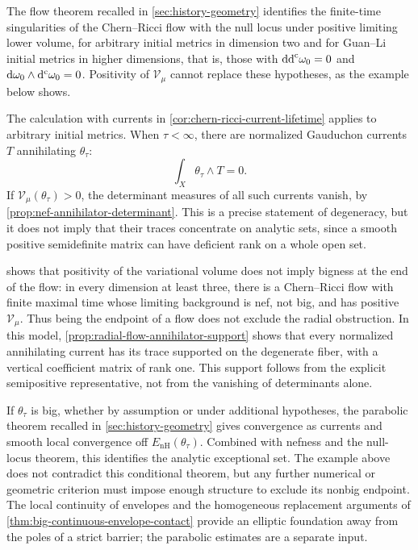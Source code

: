 The flow theorem recalled in \cref{sec:history-geometry} identifies the finite-time singularities of the Chern--Ricci flow with the null locus under positive limiting lower volume, for arbitrary initial metrics in dimension two and for Guan--Li initial metrics in higher dimensions, that is, those with $\mathrm{dd}^{\mathrm{c}}\omega_0=0$ and $\mathrm{d}\omega_0\wedge \mathrm d^{\mathrm c}\omega_0=0$. Positivity of $\mathcal V_\mu$ cannot replace these hypotheses, as the example below shows.

The calculation with currents in \cref{cor:chern-ricci-current-lifetime} applies to arbitrary initial metrics. When $\tau<\infty$, there are normalized Gauduchon currents $T$ annihilating $\theta_\tau$:
\[
 \int_X\theta_\tau\wedge T=0.
\]
If $\mathcal V_\mu(\theta_\tau)>0$, the determinant measures of all such currents vanish, by \cref{prop:nef-annihilator-determinant}. This is a precise statement of degeneracy, but it does not imply that their traces concentrate on analytic sets, since a smooth positive semidefinite matrix can have deficient rank on a whole open set.

 shows that positivity of the variational volume does not imply bigness at the end of the flow: in every dimension at least three, there is a Chern--Ricci flow with finite maximal time whose limiting background is nef, not big, and has positive $\mathcal V_\mu$. Thus being the endpoint of a flow does not exclude the radial obstruction. In this model, \cref{prop:radial-flow-annihilator-support} shows that every normalized annihilating current has its trace supported on the degenerate fiber, with a vertical coefficient matrix of rank one. This support follows from the explicit semipositive representative, not from the vanishing of determinants alone.

If $\theta_\tau$ is big, whether by assumption or under additional hypotheses, the parabolic theorem recalled in \cref{sec:history-geometry} gives convergence as currents and smooth local convergence off $E_{\mathrm{nH}}(\theta_\tau)$. Combined with nefness and the null-locus theorem, this identifies the analytic exceptional set. The example above does not contradict this conditional theorem, but any further numerical or geometric criterion must impose enough structure to exclude its nonbig endpoint. The local continuity of envelopes and the homogeneous replacement arguments of \cref{thm:big-continuous-envelope-contact} provide an elliptic foundation away from the poles of a strict barrier; the parabolic estimates are a separate input.

